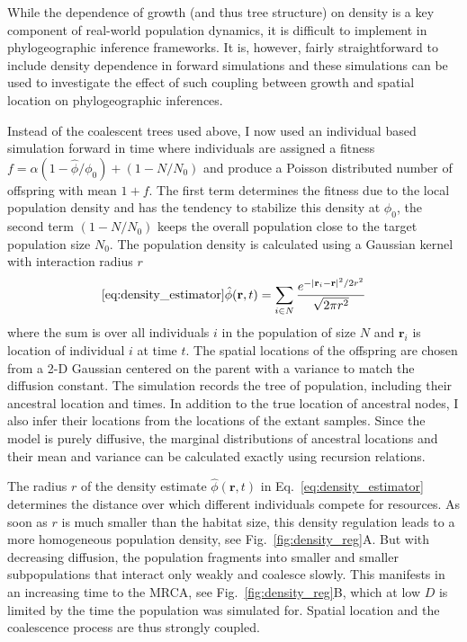 \documentclass[aps,rmp, twocolumn]{revtex4}
\newcommand{\rvec}{\mathbf{r}}
\begin{document}
While the dependence of growth (and thus tree structure) on density is a key component of real-world population dynamics, it is difficult to implement in phylogeographic inference frameworks.
It is, however, fairly straightforward to include density dependence in forward simulations and these simulations can be used to investigate the effect of such coupling between growth and spatial location on phylogeographic inferences.

Instead of the coalescent trees used above, I now used an individual based simulation forward in time where individuals are assigned a fitness $f=\alpha(1-\hat{\phi}/\phi_0) + (1-N/N_0)$ and produce a Poisson distributed number of offspring with mean $1+f$.
The first term determines the fitness due to the local population density and has the tendency to stabilize this density at $\phi_0$, the second term $(1-N/N_0)$ keeps the overall population close to the target population size $N_0$.
The population density is calculated using a Gaussian kernel with interaction radius $r$
\begin{equation}
    \ref{eq:density_estimator}
    \hat{\phi}(\rvec, t) = \sum_{i\in N} \frac{e^{-|\rvec_i - \rvec|^2/2r^2}}{\sqrt{2\pi r^2}}
\end{equation}
where the sum is over all individuals $i$ in the population of size $N$ and $\rvec_i$ is location of individual $i$ at time $t$.
The spatial locations of the offspring are chosen from a 2-D Gaussian centered on the parent with a variance to match the diffusion constant.
The simulation records the tree of population, including their ancestral location and times.
In addition to the true location of ancestral nodes, I also infer their locations from the locations of the extant samples.
Since the model is purely diffusive, the marginal distributions of ancestral locations and their mean and variance can be calculated exactly using recursion relations.

The radius $r$ of the density estimate $\hat{\phi}(\rvec, t)$ in Eq.~\ref{eq:density_estimator} determines the distance over which different individuals compete for resources.
As soon as $r$ is much smaller than the habitat size, this density regulation leads to a more homogeneous population density, see Fig.~\ref{fig:density_reg}A.
But with decreasing diffusion, the population fragments into smaller and smaller subpopulations that interact only weakly and coalesce slowly.
This manifests in an increasing time to the MRCA, see Fig.~\ref{fig:density_reg}B, which at low $D$ is limited by the time the population was simulated for.
Spatial location and the coalescence process are thus strongly coupled.
\end{document}
